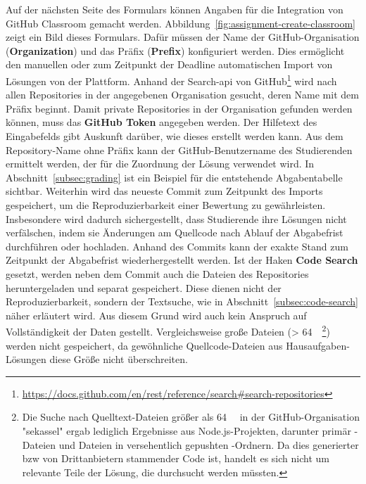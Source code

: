 Auf der nächsten Seite des Formulars können Angaben für die Integration von GitHub Classroom gemacht werden.
Abbildung~\ref{fig:assignment-create-classroom} zeigt ein Bild dieses Formulars.
Dafür müssen der Name der GitHub-Organisation (\textbf{Organization}) und das Präfix (\textbf{Prefix}) konfiguriert werden.
Dies ermöglicht den manuellen oder zum Zeitpunkt der Deadline automatischen Import von Lösungen von der Plattform.
Anhand der Search-\ac{api} von GitHub\footnote{
    \url{https://docs.github.com/en/rest/reference/search\#search-repositories}
} wird nach allen Repositories in der angegebenen Organisation gesucht, deren Name mit dem Präfix beginnt.
Damit private Repositories in der Organisation gefunden werden können, muss das \textbf{GitHub Token} angegeben werden.
Der Hilfetext des Eingabefelds gibt Auskunft darüber, wie dieses erstellt werden kann.
Aus dem Repository-Name ohne Präfix kann der GitHub-Benutzername des Studierenden ermittelt werden, der für die Zuordnung der Lösung verwendet wird.
In Abschnitt~\ref{subsec:grading} ist ein Beispiel für die entstehende Abgabentabelle sichtbar.
Weiterhin wird das neueste Commit zum Zeitpunkt des Imports gespeichert, um die Reproduzierbarkeit einer Bewertung zu gewährleisten.
Insbesondere wird dadurch sichergestellt, dass Studierende ihre Lösungen nicht verfälschen, indem sie Änderungen am Quellcode nach Ablauf der Abgabefrist durchführen oder hochladen.
Anhand des Commits kann der exakte Stand zum Zeitpunkt der Abgabefrist wiederhergestellt werden.
Ist der Haken \textbf{Code Search} gesetzt, werden neben dem Commit auch die Dateien des Repositories heruntergeladen und separat gespeichert.
Diese dienen nicht der Reproduzierbarkeit, sondern der Textsuche, wie in Abschnitt~\ref{subsec:code-search} näher erläutert wird.
Aus diesem Grund wird auch kein Anspruch auf Vollständigkeit der Daten gestellt.
Vergleichsweise große Dateien (> \SI{64}{\kibi\byte}\footnote{
    Die Suche nach Quelltext-Dateien größer als \SI{64}{\kibi\byte} in der GitHub-Organisation "sekassel" ergab lediglich Ergebnisse aus Node.js-Projekten, darunter primär -Dateien und Dateien in versehentlich gepushten -Ordnern.
    Da dies generierter \ac{bzw} von Drittanbietern stammender Code ist, handelt es sich nicht um relevante Teile der Lösung, die durchsucht werden müssten.
}) werden nicht gespeichert, da gewöhnliche Quellcode-Dateien aus Hausaufgaben-Lösungen diese Größe nicht überschreiten.

